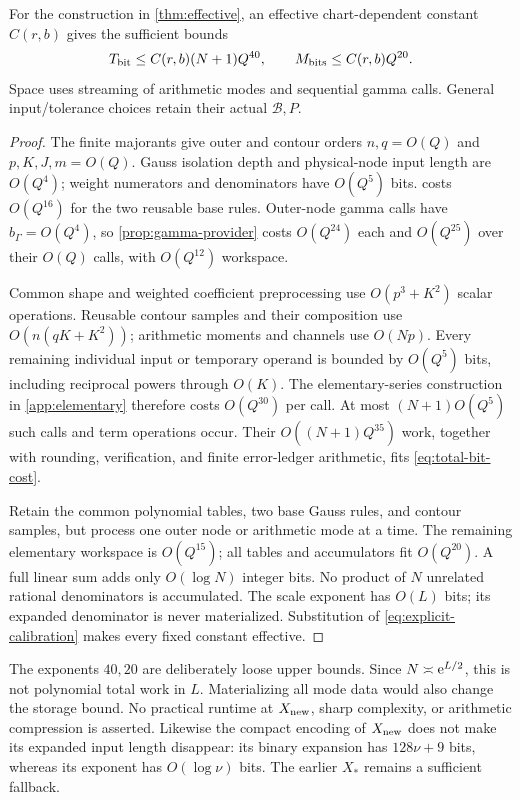 \begin{theorem}\label{thm:bit-cost}
For the construction in \cref{thm:effective}, an effective
chart-dependent constant \(C(r,b)\) gives the sufficient bounds
\begin{equation}
 T_{\rm bit}\le C(r,b)(N+1)Q^{40},\qquad
 M_{\rm bits}\le C(r,b)Q^{20}.
 \label{eq:total-bit-cost}
\end{equation}
Space uses streaming of arithmetic modes and sequential gamma calls.
General input/tolerance choices retain their actual \(\mathcal B,P\).
\end{theorem}
\begin{proof}
The finite majorants give outer and contour orders \(n,q=O(Q)\)
and \(p,K,J,m=O(Q)\). Gauss isolation depth and physical-node input
length are \(O(Q^4)\); weight numerators and denominators have
\(O(Q^5)\) bits.  costs \(O(Q^{16})\)
for the two reusable base rules. Outer-node gamma calls have
\(b_\Gamma=O(Q^4)\), so \cref{prop:gamma-provider} costs
\(O(Q^{24})\) each and \(O(Q^{25})\) over their \(O(Q)\) calls,
with \(O(Q^{12})\) workspace.

Common shape and weighted coefficient preprocessing use
\(O(p^3+K^2)\) scalar operations. Reusable contour samples and their
composition use \(O(n(qK+K^2))\); arithmetic moments and channels use
\(O(Np)\). Every remaining individual input or temporary operand is
bounded by \(O(Q^5)\) bits, including reciprocal powers through
\(O(K)\). The elementary-series construction in \cref{app:elementary}
therefore costs \(O(Q^{30})\) per call. At most
\((N+1)O(Q^5)\) such calls and term operations occur.
Their \(O((N+1)Q^{35})\) work, together with rounding, verification,
and finite error-ledger arithmetic, fits \eqref{eq:total-bit-cost}.

Retain the common polynomial tables, two base Gauss rules, and contour
samples, but process one outer node or arithmetic mode at a time.
The remaining elementary workspace is \(O(Q^{15})\); all tables and
accumulators fit \(O(Q^{20})\). A full linear sum adds only
\(O(\log N)\) integer bits. No product of \(N\) unrelated rational
denominators is accumulated. The scale exponent has \(O(L)\) bits;
its expanded denominator is never materialized. Substitution of
\eqref{eq:explicit-calibration} makes every fixed constant effective.
\end{proof}
The exponents \(40,20\) are deliberately loose upper bounds.
Since \(N\asymp\mathrm e^{L/2}\), this is not polynomial total work in
\(L\). Materializing all mode data would also change the storage bound.
No practical runtime at \(X_{\rm new}\), sharp complexity, or arithmetic
compression is asserted. Likewise the compact encoding of \(X_{\rm new}\)
does not make its expanded input length disappear: its binary expansion
has \(128\nu+9\) bits, whereas its exponent has \(O(\log\nu)\) bits.
The earlier \(X_*\) remains a sufficient fallback.

